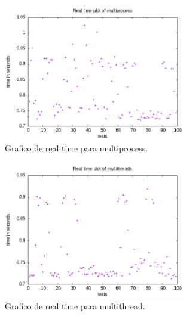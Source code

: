 \documentclass[12pt]{article}
\begin{document}
    \begin{figure}[H]
        \caption{Grafico de real time para multiprocess.}
        \centering
        \includegraphics[width=8cm]{doc/real_processos.png}
    \end{figure}

    \begin{figure}[H]
        \caption{Grafico de real time para multithread.}
        \centering
        \includegraphics[width=8cm]{doc/real_threads.png}
    \end{figure}
\end{document}
